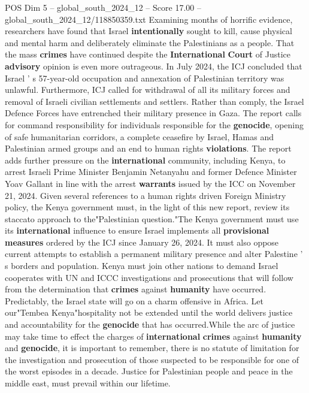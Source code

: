 \begin{textsample}{POS Dim 5 – global\_south\_2024\_12 – Score 17.00 – global\_south\_2024\_12/118850359.txt}
Examining months of horrific evidence, researchers have found that Israel \textbf{intentionally} sought to kill, cause physical and mental harm and deliberately eliminate the Palestinians as a people.
That the mass \textbf{crimes} have continued despite the \textbf{International} \textbf{Court} of Justice \textbf{advisory} opinion is even more outrageous.
In July 2024, the ICJ concluded that Israel ' s 57-year-old occupation and annexation of Palestinian territory was unlawful.
Furthermore, ICJ called for withdrawal of all its military forces and removal of Israeli civilian settlements and settlers.
Rather than comply, the Israel Defence Forces have entrenched their military presence in Gaza.
The report calls for command responsibility for individuals responsible for the \textbf{genocide}, opening of safe humanitarian corridors, a complete ceasefire by Israel, Hamas and Palestinian armed groups and an end to human rights \textbf{violations}.
The report adds further pressure on the \textbf{international} community, including Kenya, to arrest Israeli Prime Minister Benjamin Netanyahu and former Defence Minister Yoav Gallant in line with the arrest \textbf{warrants} issued by the ICC on November 21, 2024.
Given several references to a human rights driven Foreign Ministry policy, the Kenya government must, in the light of this new report, review its staccato approach to the"Palestinian question."The Kenya government must use its \textbf{international} influence to ensure Israel implements all \textbf{provisional} \textbf{measures} ordered by the ICJ since January 26, 2024.
It must also oppose current attempts to establish a permanent military presence and alter Palestine ' s borders and population.
Kenya must join other nations to demand Israel cooperates with UN and ICCC investigations and prosecutions that will follow from the determination that \textbf{crimes} against \textbf{humanity} have occurred.
Predictably, the Israel state will go on a charm offensive in Africa.
Let our"Tembea Kenya"hospitality not be extended until the world delivers justice and accountability for the \textbf{genocide} that has occurred.While the arc of justice may take time to effect the charges of \textbf{international} \textbf{crimes} against \textbf{humanity} and \textbf{genocide}, it is important to remember, there is no statute of limitation for the investigation and prosecution of those suspected to be responsible for one of the worst episodes in a decade.
Justice for Palestinian people and peace in the middle east, must prevail within our lifetime.

\end{textsample}
